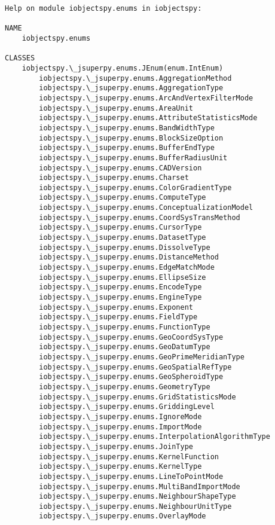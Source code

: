 \documentclass[11pt]{article}
\begin{document}
    \begin{Verbatim}[commandchars=\\\{\}]
Help on module iobjectspy.enums in iobjectspy:

NAME
    iobjectspy.enums

CLASSES
    iobjectspy.\_jsuperpy.enums.JEnum(enum.IntEnum)
        iobjectspy.\_jsuperpy.enums.AggregationMethod
        iobjectspy.\_jsuperpy.enums.AggregationType
        iobjectspy.\_jsuperpy.enums.ArcAndVertexFilterMode
        iobjectspy.\_jsuperpy.enums.AreaUnit
        iobjectspy.\_jsuperpy.enums.AttributeStatisticsMode
        iobjectspy.\_jsuperpy.enums.BandWidthType
        iobjectspy.\_jsuperpy.enums.BlockSizeOption
        iobjectspy.\_jsuperpy.enums.BufferEndType
        iobjectspy.\_jsuperpy.enums.BufferRadiusUnit
        iobjectspy.\_jsuperpy.enums.CADVersion
        iobjectspy.\_jsuperpy.enums.Charset
        iobjectspy.\_jsuperpy.enums.ColorGradientType
        iobjectspy.\_jsuperpy.enums.ComputeType
        iobjectspy.\_jsuperpy.enums.ConceptualizationModel
        iobjectspy.\_jsuperpy.enums.CoordSysTransMethod
        iobjectspy.\_jsuperpy.enums.CursorType
        iobjectspy.\_jsuperpy.enums.DatasetType
        iobjectspy.\_jsuperpy.enums.DissolveType
        iobjectspy.\_jsuperpy.enums.DistanceMethod
        iobjectspy.\_jsuperpy.enums.EdgeMatchMode
        iobjectspy.\_jsuperpy.enums.EllipseSize
        iobjectspy.\_jsuperpy.enums.EncodeType
        iobjectspy.\_jsuperpy.enums.EngineType
        iobjectspy.\_jsuperpy.enums.Exponent
        iobjectspy.\_jsuperpy.enums.FieldType
        iobjectspy.\_jsuperpy.enums.FunctionType
        iobjectspy.\_jsuperpy.enums.GeoCoordSysType
        iobjectspy.\_jsuperpy.enums.GeoDatumType
        iobjectspy.\_jsuperpy.enums.GeoPrimeMeridianType
        iobjectspy.\_jsuperpy.enums.GeoSpatialRefType
        iobjectspy.\_jsuperpy.enums.GeoSpheroidType
        iobjectspy.\_jsuperpy.enums.GeometryType
        iobjectspy.\_jsuperpy.enums.GridStatisticsMode
        iobjectspy.\_jsuperpy.enums.GriddingLevel
        iobjectspy.\_jsuperpy.enums.IgnoreMode
        iobjectspy.\_jsuperpy.enums.ImportMode
        iobjectspy.\_jsuperpy.enums.InterpolationAlgorithmType
        iobjectspy.\_jsuperpy.enums.JoinType
        iobjectspy.\_jsuperpy.enums.KernelFunction
        iobjectspy.\_jsuperpy.enums.KernelType
        iobjectspy.\_jsuperpy.enums.LineToPointMode
        iobjectspy.\_jsuperpy.enums.MultiBandImportMode
        iobjectspy.\_jsuperpy.enums.NeighbourShapeType
        iobjectspy.\_jsuperpy.enums.NeighbourUnitType
        iobjectspy.\_jsuperpy.enums.OverlayMode

\end{Verbatim}
\end{document}
